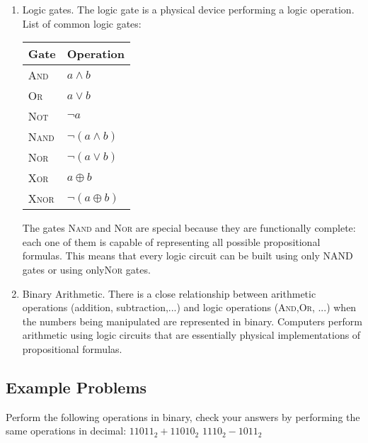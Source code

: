 \documentclass[solution, letterpaper]{cs20}
\begin{document}
	    \begin{enumerate}

        \item Logic gates. The logic gate is a physical device performing a logic operation. List of common logic gates:
        \begin{table}[h]

        \centering
        \begin{tabular}{| l | l |}
        \hline
        Gate & Operation \\ \hline
        \textsc{And} & $a \land b$ \\ \hline
        \textsc{Or} & $a \lor b$ \\ \hline
        \textsc{Not} & $\lnot a$ \\ \hline
        \textsc{Nand} & $\lnot(a \land b)$ \\ \hline
        \textsc{Nor} & $\lnot(a \lor b)$ \\ \hline
        \textsc{Xor} & $a \oplus b$ \\ \hline
        \textsc{Xnor} & $\lnot (a \oplus b)$ \\ \hline
        \end{tabular}
        \end{table}

        The gates \textsc{Nand} and \textsc{Nor} are special because they are functionally complete: each one of them is capable of representing all possible propositional formulas. This means that every logic circuit can be built using only NAND gates or using only\textsc{Nor} gates.

        \item Binary Arithmetic. There is a close relationship between arithmetic operations (addition, subtraction,...) and logic operations (\textsc{And},\textsc{Or}, ...) when the numbers being manipulated are represented in binary. Computers perform arithmetic using logic circuits that are essentially physical implementations of propositional formulas.

        \end{enumerate}

    \subsection{Example Problems}

        Perform the following operations in binary, check your answers by performing the same operations in decimal:
            \subproblem $11011_2 + 11010_2$
            \subproblem $1110_2 - 1011_2$
\end{document}
